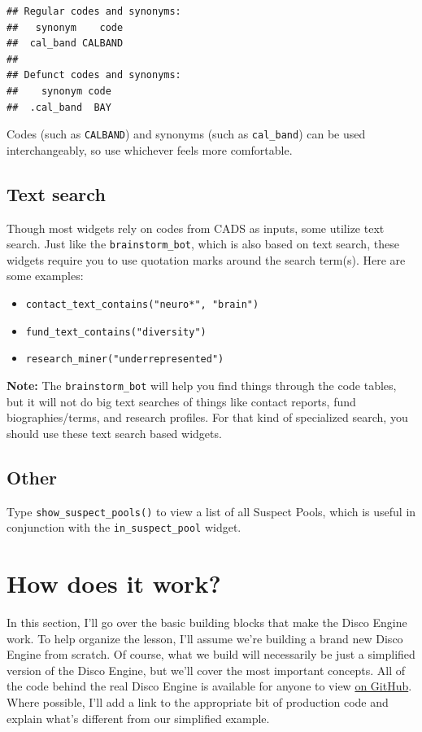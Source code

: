 \documentclass[]{book}
\providecommand{\tightlist}{%
  \setlength{\itemsep}{0pt}\setlength{\parskip}{0pt}}
\begin{document}
\begin{verbatim}
## Regular codes and synonyms:
##   synonym    code
##  cal_band CALBAND
## 
## Defunct codes and synonyms:
##    synonym code
##  .cal_band  BAY
\end{verbatim}

Codes (such as \texttt{CALBAND}) and synonyms (such as \texttt{cal\_band}) can be used interchangeably, so use whichever feels more comfortable.

\hypertarget{text-search}{%
\section{Text search}\label{text-search}}

Though most widgets rely on codes from CADS as inputs, some utilize text search. Just like the \texttt{brainstorm\_bot}, which is also based on text search, these widgets require you to use quotation marks around the search term(s). Here are some examples:

\begin{itemize}
\tightlist
\item
  \texttt{contact\_text\_contains("neuro*",\ "brain")}
\item
  \texttt{fund\_text\_contains("diversity")}
\item
  \texttt{research\_miner("underrepresented")}
\end{itemize}

\textbf{Note:} The \texttt{brainstorm\_bot} will help you find things through the code tables, but it will not do big text searches of things like contact reports, fund biographies/terms, and research profiles. For that kind of specialized search, you should use these text search based widgets.

\hypertarget{other}{%
\section{Other}\label{other}}

Type \texttt{show\_suspect\_pools()} to view a list of all Suspect Pools, which is useful in conjunction with the \texttt{in\_suspect\_pool} widget.

\hypertarget{how-it-works}{%
\chapter{How does it work?}\label{how-it-works}}

In this section, I'll go over the basic building blocks that make the Disco Engine work. To help organize the lesson, I'll assume we're building a brand new Disco Engine from scratch. Of course, what we build will necessarily be just a simplified version of the Disco Engine, but we'll cover the most important concepts. All of the code behind the real Disco Engine is available for anyone to view \href{https://github.com/cwolfsonseeley/discoveryengine}{on GitHub}. Where possible, I'll add a link to the appropriate bit of production code and explain what's different from our simplified example.
\end{document}
